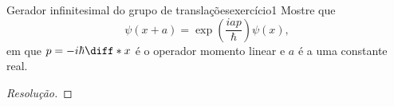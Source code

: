 \begin{exercício}{Gerador infinitesimal do grupo de translações}{exercício1}
    Mostre que
    \begin{equation*}
        \psi(x + a) = \exp\left(\frac{i a p}{\hbar}\right)\psi(x),
    \end{equation*}
    em que \(p = -i\hbar \diff*{}{x}\) é o operador momento linear e \(a\) é a uma constante real.
\end{exercício}
\begin{proof}[Resolução]

\end{proof}

